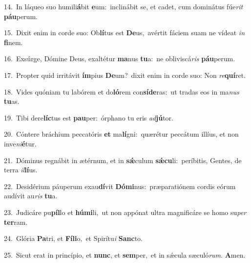 {\numbfont\textcolor{\numbcolor}{14.}}~In láqueo suo humili\-\textbf{á}\-bit \textbf{e}\-um:~\star inclinábit se, et cadet, cum dominátus fúe\textit{rit} \textbf{páu}\-perum.\par
{\numbfont\textcolor{\numbcolor}{15.}}~Dixit enim in corde suo: Ob\-\textbf{lí}\-tus est \textbf{De}\-us,~\star avértit fáciem suam ne vídeat \textit{in} \textbf{fi}\-nem.\par
{\numbfont\textcolor{\numbcolor}{16.}}~Exsúrge, Dómine Deus, exaltétur \textbf{ma}\-nus \textbf{tu}\-a:~\star ne obliviscá\textit{ris} \textbf{páu}\-perum.\par
{\numbfont\textcolor{\numbcolor}{17.}}~Propter quid irritávit \textbf{ím}\-pius \textbf{De}\-um?~\star dixit enim in corde suo: Non \textit{re}\-\textbf{quí}ret.\par
{\numbfont\textcolor{\numbcolor}{18.}}~Vides quóniam tu labórem et do\-\textbf{ló}\-rem con\-\textbf{sí}\-\textbf{de}ras:~\star ut tradas eos in ma\textit{nus} \textbf{tu}\-as.\par
{\numbfont\textcolor{\numbcolor}{19.}}~Tibi dere\-\textbf{líc}\-tus est \textbf{pau}\-per:~\star órphano tu eris \textit{ad}\-\textbf{jú}tor.\par
{\numbfont\textcolor{\numbcolor}{20.}}~Cóntere bráchium peccatóris \textbf{et} ma\-\textbf{lí}\-gni:~\star quærétur peccátum illíus, et non inve\-\textit{ni}\-\textbf{é}tur.\par
{\numbfont\textcolor{\numbcolor}{21.}}~Dóminus regnábit in ætérnum, et in \textbf{sǽ}\-culum \textbf{sǽ}\-\textbf{cu}li:~\star períbitis, Gentes, de terra \textit{il}\-\textbf{lí}us.\par
{\numbfont\textcolor{\numbcolor}{22.}}~Desidérium páuperum exau\-\textbf{dí}\-vit \textbf{Dó}\-\textbf{mi}nus:~\star præparatiónem cordis eórum audívit au\textit{ris} \textbf{tu}\-a.\par
{\numbfont\textcolor{\numbcolor}{23.}}~Judicáre pu\-\textbf{píl}\-lo et \textbf{hú}\-\textbf{mi}li,~\star ut non appónat ultra magnificáre se homo su\textit{per} \textbf{ter}\-ram.\par
{\numbfont\textcolor{\numbcolor}{24.}}~Glória \textbf{Pa}\-tri, et \textbf{Fí}\-\textbf{li}o,~\star et Spirítu\textit{i} \textbf{Sanc}\-to.\par
{\numbfont\textcolor{\numbcolor}{25.}}~Sicut erat in princípio, et \textbf{nunc}\-, et \textbf{sem}\-per,~\star et in sǽcula sæculó\-\textit{rum}\-. \textbf{A}\-men.\par
